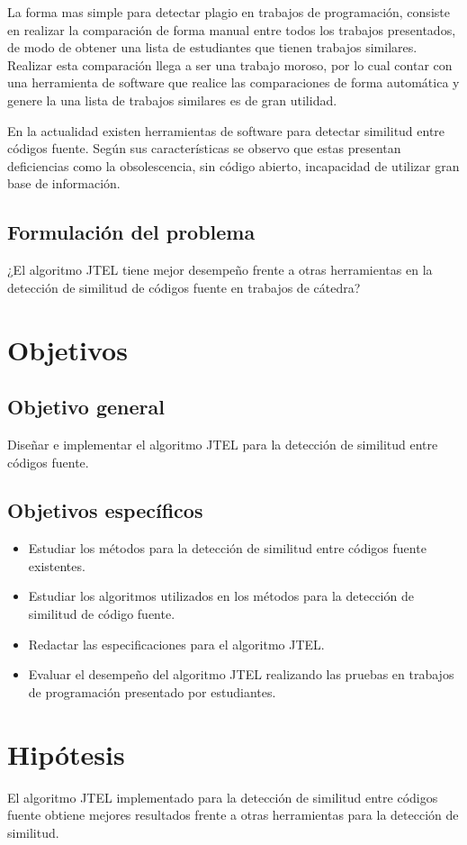La forma mas simple para detectar plagio en trabajos de programación, consiste en realizar la comparación de forma manual entre todos los trabajos presentados, de modo de obtener una lista de estudiantes que tienen trabajos similares. Realizar esta comparación llega a ser una trabajo moroso, por lo cual contar con una herramienta de software que realice las comparaciones de forma automática y genere la una lista de trabajos similares es de gran utilidad.

En la actualidad existen herramientas de software para detectar similitud entre códigos fuente. Según sus características se observo que estas presentan deficiencias como la obsolescencia, sin código abierto, incapacidad de utilizar gran base de información.
\subsection{Formulación del problema}
¿El algoritmo JTEL tiene mejor desempeño frente a otras herramientas en la detección de similitud de códigos fuente en trabajos de cátedra?

\section{Objetivos}
\subsection{Objetivo general}
Diseñar e implementar el algoritmo JTEL para la detección de similitud entre códigos fuente.
\subsection{Objetivos específicos}
\begin{itemize}
    \item Estudiar los métodos para la detección de similitud entre códigos fuente existentes.
    \item Estudiar los algoritmos utilizados en los métodos para la detección de similitud de código fuente.
    \item Redactar las especificaciones para el algoritmo JTEL.
    \item Evaluar el desempeño del algoritmo JTEL realizando las pruebas en trabajos de programación presentado por estudiantes.
\end{itemize}

\section{Hipótesis}
El algoritmo JTEL implementado para la detección de similitud entre códigos fuente obtiene mejores resultados frente a otras herramientas para la detección de similitud.
